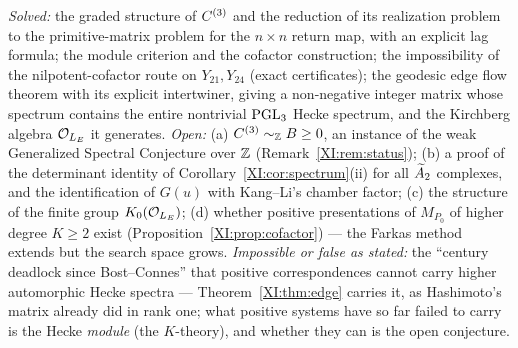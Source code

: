 \begin{remark}\label{XI:rem:scope}
\emph{Solved:} the graded structure of $C^{(3)}$ and the reduction of its realization
problem to the primitive-matrix problem for the $n\times n$ return map, with an explicit lag
formula; the module criterion and the cofactor construction; the impossibility of the
nilpotent-cofactor route on $Y_{21},Y_{24}$ (exact certificates); the geodesic edge flow
theorem with its explicit intertwiner, giving a non-negative integer matrix whose spectrum
contains the entire nontrivial $\mathrm{PGL}_3$ Hecke spectrum, and the Kirchberg algebra
$\mathcal{O}_{L_E}$ it generates. \emph{Open:} (a) $C^{(3)}\sim_{\mathbb{Z}} B\ge0$, an instance of the weak
Generalized Spectral Conjecture over $\mathbb{Z}$ (Remark~\ref{XI:rem:status}); (b) a proof of the
determinant identity of Corollary~\ref{XI:cor:spectrum}(ii) for all $\widetilde A_2$ complexes, and the
identification of $G(u)$ with Kang--Li's chamber factor; (c) the structure of the finite
group $K_0(\mathcal{O}_{L_E})$; (d) whether positive presentations of $M_{P_0}$ of higher degree
$K\ge2$ exist (Proposition~\ref{XI:prop:cofactor}) --- the Farkas method extends but the
search space grows. \emph{Impossible or false as stated:} the ``century deadlock since
Bost--Connes'' that positive correspondences cannot carry higher automorphic Hecke spectra
--- Theorem~\ref{XI:thm:edge} carries it, as Hashimoto's matrix already did in rank one; what
positive systems have so far failed to carry is the Hecke \emph{module} (the $K$-theory),
and whether they can is the open conjecture.
\end{remark}

